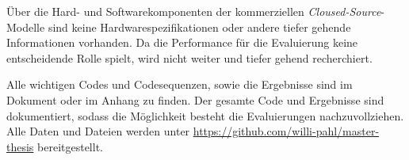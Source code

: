 Über die Hard- und Softwarekomponenten der kommerziellen \textit{Cloused-Source}-Modelle sind keine Hardwarespezifikationen oder andere tiefer gehende Informationen vorhanden. Da die Performance für die Evaluierung keine entscheidende Rolle spielt, wird nicht weiter und tiefer gehend recherchiert. \vspace{0.2cm}

Alle wichtigen Codes und Codesequenzen, sowie die Ergebnisse sind im Dokument oder im Anhang zu finden. Der gesamte Code und Ergebnisse sind dokumentiert, sodass die Möglichkeit besteht die Evaluierungen nachzuvollziehen. Alle Daten und Dateien werden unter \href{https://github.com/willi-pahl/master-thesis}{https://github.com/willi-pahl/master-thesis} bereitgestellt.\vspace{0.2cm}


